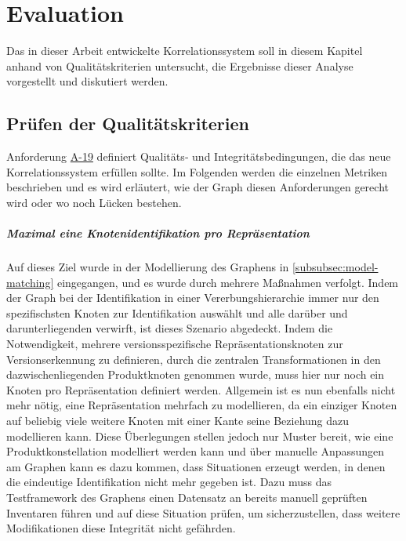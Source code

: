 \chapter{Evaluation}\label{ch:evaluation}

Das in dieser Arbeit entwickelte Korrelationssystem soll in diesem Kapitel anhand von Qualitätskriterien untersucht, die Ergebnisse dieser Analyse vorgestellt und diskutiert werden.


\section{Prüfen der Qualitätskriterien}

Anforderung \hyperref[subsec:req-graph-inner-consistency]{A-19} definiert Qualitäts‑ und Integritätsbedingungen, die das neue Korrelationssystem erfüllen sollte.
Im Folgenden werden die einzelnen Metriken beschrieben und es wird erläutert, wie der Graph diesen Anforderungen gerecht wird oder wo noch Lücken bestehen.

\paragraph{Maximal eine Knotenidentifikation pro Repräsentation}
Auf dieses Ziel wurde in der Modellierung des Graphens in \autoref{subsubsec:model-matching} eingegangen, und es wurde durch mehrere Maßnahmen verfolgt.
Indem der Graph bei der Identifikation in einer Vererbungshierarchie immer nur den spezifischsten Knoten zur Identifikation auswählt und alle darüber und darunterliegenden verwirft, ist dieses Szenario abgedeckt.
Indem die Notwendigkeit, mehrere versionsspezifische Repräsentationsknoten zur Versionserkennung zu definieren, durch die zentralen Transformationen in den dazwischenliegenden Produktknoten genommen wurde, muss hier nur noch ein Knoten pro Repräsentation definiert werden.
Allgemein ist es nun ebenfalls nicht mehr nötig, eine Repräsentation mehrfach zu modellieren, da ein einziger Knoten auf beliebig viele weitere Knoten mit einer Kante seine Beziehung dazu modellieren kann.
Diese Überlegungen stellen jedoch nur Muster bereit, wie eine Produktkonstellation modelliert werden kann und über manuelle Anpassungen am Graphen kann es dazu kommen, dass Situationen erzeugt werden, in denen die eindeutige Identifikation nicht mehr gegeben ist.
Dazu muss das Testframework des Graphens einen Datensatz an bereits manuell geprüften Inventaren führen und auf diese Situation prüfen, um sicherzustellen, dass weitere Modifikationen diese Integrität nicht gefährden.


